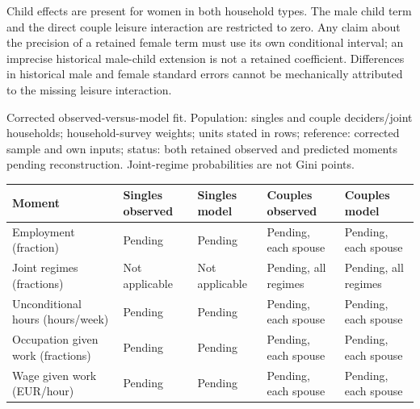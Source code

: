 \documentclass[11pt,a4paper]{article}
\begin{document}
Child effects are present for women in both household types. The male child term and the direct couple leisure interaction are restricted to zero. Any claim about the precision of a retained female term must use its own conditional interval; an imprecise historical male-child extension is not a retained coefficient. Differences in historical male and female standard errors cannot be mechanically attributed to the missing leisure interaction.

Corrected observed-versus-model fit. Population: singles and couple deciders/joint households; household-survey weights; units stated in rows; reference: corrected sample and own inputs; status: both retained observed and predicted moments pending reconstruction. Joint-regime probabilities are not Gini points.

{ %
\small\setlength{\tabcolsep}{3pt}\begin{longtable}[]{@{}
  >{\raggedright\arraybackslash}p{}
  >{\raggedright\arraybackslash}p{}
  >{\raggedright\arraybackslash}p{}
  >{\raggedright\arraybackslash}p{}
  >{\raggedright\arraybackslash}p{}@{}}
\toprule\noalign{}
\begin{minipage}[b]{\linewidth}\raggedright
Moment
\end{minipage} & \begin{minipage}[b]{\linewidth}\raggedright
Singles observed
\end{minipage} & \begin{minipage}[b]{\linewidth}\raggedright
Singles model
\end{minipage} & \begin{minipage}[b]{\linewidth}\raggedright
Couples observed
\end{minipage} & \begin{minipage}[b]{\linewidth}\raggedright
Couples model
\end{minipage} \\
\midrule\noalign{}
\endhead
\bottomrule\noalign{}
\endlastfoot
Employment (fraction) & Pending & Pending & Pending, each spouse & Pending, each spouse \\
Joint regimes (fractions) & Not applicable & Not applicable & Pending, all regimes & Pending, all regimes \\
Unconditional hours (hours/week) & Pending & Pending & Pending, each spouse & Pending, each spouse \\
Occupation given work (fractions) & Pending & Pending & Pending, each spouse & Pending, each spouse \\
Wage given work (EUR/hour) & Pending & Pending & Pending, each spouse & Pending, each spouse \\
\end{longtable}
}
\end{document}
